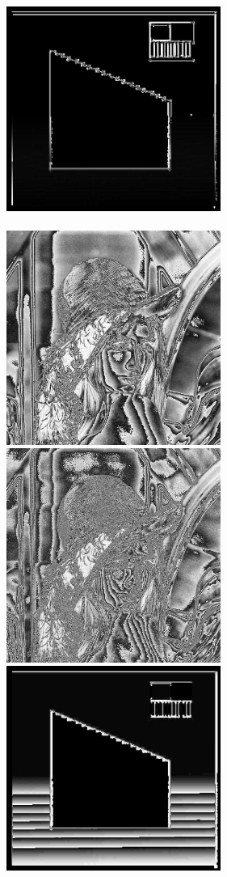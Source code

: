 \documentclass[a4paper,12pt,openany]{report}
\begin{document}
\begin{center}
\includegraphics[width=7cm]{resources/modified/sample/sample_emboss_2.jpg}\\
\pagebreak
{}\\
\includegraphics[width=7cm]{resources/modified/lena/lena_ridge_detection_1.jpg}
\includegraphics[width=7cm]{resources/modified/lena/lena_ridge_detection_2.jpg}
\includegraphics[width=7cm]{resources/modified/sample/sample_ridge_detection_1.jpg}

\end{center}
\end{document}
